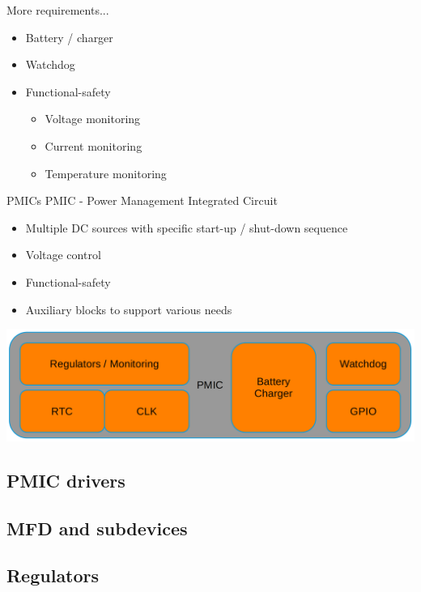 \documentclass[10pt]{beamer}
\begin{document}

\begin{frame}{More requirements...}
\begin{itemize}
	\item Battery / charger
	\item Watchdog
	\item Functional-safety
	\begin{itemize}
		\item Voltage monitoring
		\item Current monitoring
		\item Temperature monitoring
	\end{itemize}
\end{itemize}
\end{frame}


\begin{frame}{PMICs}
PMIC - Power Management Integrated Circuit
\begin{itemize}
	\item Multiple DC sources with specific start-up / shut-down sequence
	\item Voltage control
	\item Functional-safety
	\item Auxiliary blocks to support various needs\\ [10pt]
\end{itemize}

\includegraphics[width=1\linewidth]{img/pmic_block.png}
\end{frame}

\begin{frame}
\section{PMIC drivers}
\subsection{MFD and subdevices}
\subsection{Regulators}
\end{frame}
\end{document}
